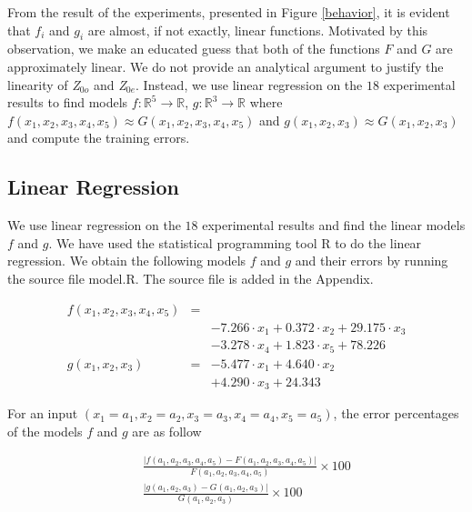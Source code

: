 \documentclass[journal]{IEEEtran}
\begin{document}
From the result of the experiments, presented in Figure \ref{behavior}, it is evident that $f_i$ and  $g_i$ are almost, if not exactly, linear functions. Motivated by this observation, we make an educated guess that both of the functions $F$ and $G$ are approximately linear. We do not provide an analytical argument to justify the linearity of \textit{Z$_{0o}$} and \textit{Z$_{0e}$}. Instead, we use linear regression on the $18$ experimental results to find models $f:\mathbb{R}^5 \rightarrow \mathbb{R}$, $g:\mathbb{R}^3 \rightarrow \mathbb{R}$ where $f(x_1,x_2,x_3,x_4,x_5) \approx G(x_1,x_2,x_3,x_4,x_5)$ and $g(x_1,x_2,x_3) \approx G(x_1,x_2,x_3)$ and compute the training errors.

\subsection{Linear Regression}
We use linear regression on the $18$ experimental results and find the linear models $f$ and $g$. We have used the statistical programming tool R to do the linear regression. We obtain the following models $f$ and $g$ and their errors by running the source file \textsf{model.R}. The source file is added in the Appendix.

\begin{small}
	\begin{eqnarray}
		f(x_1, x_2, x_3, x_4, x_5) &=& \nonumber \\ 
		& &-7.266 \cdot x_1 + 0.372 \cdot x_2 + 29.175 \cdot x_3 \nonumber \\
		& &- 3.278 \cdot x_4 + 1.823 \cdot x_5 + 78.226 \\
		g(x_1, x_2, x_3) &=& -5.477 \cdot x_1 + 4.640 \cdot x_2  \nonumber \\
		& & + 4.290 \cdot x_3 + 24.343
	\end{eqnarray}
\end{small}

For an input $(x_1 = a_1,x_2 = a_2,x_3 = a_3,x_4 = a_4,x_5 = a_5)$, the error percentages of the models $f$ and $g$ are as follow

	\begin{eqnarray*}
		& & \frac{|f(a_1,a_2,a_3,a_4,a_5)-F(a_1,a_2,a_3,a_4,a_5)|}{F(a_1,a_2,a_3,a_4,a_5)} \times 100\\
		& & \frac{|g(a_1,a_2,a_3)-G(a_1,a_2,a_3)|}{G(a_1,a_2,a_3)}\times 100
	\end{eqnarray*}
\end{document}
